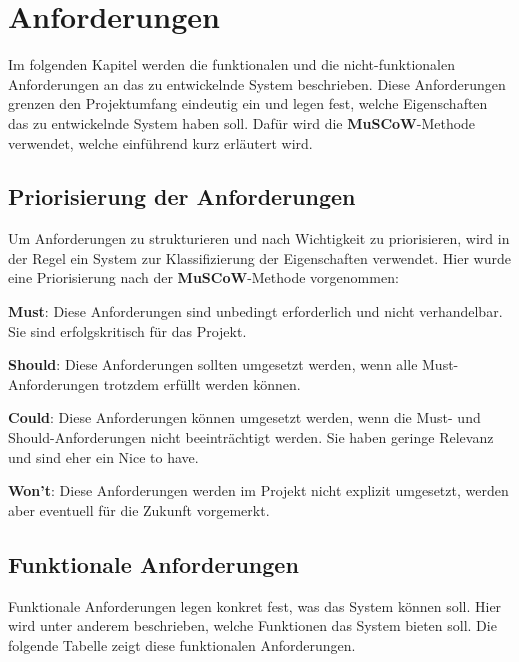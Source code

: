 \documentclass[../review_1.tex]{subfiles}
\begin{document}
\chapter{Anforderungen}
\noindent Im folgenden Kapitel werden die funktionalen und die nicht-funktionalen Anforderungen an das zu entwickelnde System beschrieben. Diese Anforderungen grenzen den Projektumfang eindeutig ein und legen fest, welche Eigenschaften das zu entwickelnde System haben soll. Dafür wird die \textbf{MuSCoW}-Methode verwendet, welche einführend kurz erläutert wird.

\section{Priorisierung der Anforderungen}\thispagestyle{fancy}
Um Anforderungen zu strukturieren und nach Wichtigkeit zu priorisieren, wird in der Regel ein System zur Klassifizierung der Eigenschaften verwendet. Hier wurde eine Priorisierung nach der \textbf{MuSCoW}-Methode vorgenommen:
\begin{description}
    \item{\textbf{Must}:} Diese Anforderungen sind unbedingt erforderlich und nicht verhandelbar. Sie sind erfolgskritisch für das Projekt.
    \item{\textbf{Should}:} Diese Anforderungen sollten umgesetzt werden, wenn alle Must-Anforderungen trotzdem erfüllt werden können.
    \item{\textbf{Could}:} Diese Anforderungen können umgesetzt werden, wenn die Must- und Should-Anforderungen nicht beeinträchtigt werden. Sie haben geringe Relevanz und sind eher ein \glqq Nice to have\grqq.
    \item{\textbf{Won't}:} Diese Anforderungen werden im Projekt nicht explizit umgesetzt, werden aber eventuell für die Zukunft vorgemerkt.
\end{description}

\section{Funktionale Anforderungen}

Funktionale Anforderungen legen konkret fest, was das System können soll. Hier wird unter anderem beschrieben, welche Funktionen das System bieten soll. Die folgende Tabelle zeigt diese funktionalen Anforderungen.
\end{document}
